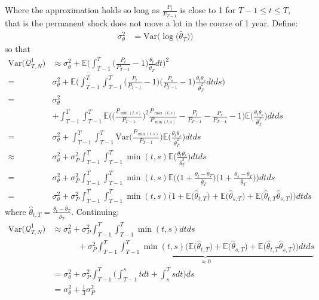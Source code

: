 Where the approximation holds so long as $\frac{P_{t}}{P_{T-1}}$ is close to 1 for $T-1 \leq t \leq T$, that is the permanent shock does not move a lot in the course of 1 year. Define:
\begin{align*}
\sigma^2_{\theta}&= \mathrm{Var}\Bigg(\log \Big(\bar{\theta}_T \Big) \Bigg)
\end{align*}
so that
\begin{align*}
\mathrm{Var}\big(\mathcal{Q}^1_{T,N}\big) &\approx \sigma^2_{\theta} + \mathbb{E} \Bigg(\int_{T-1}^{T} \Big(\frac{P_t}{P_{T-1}}-1\Big)\frac{\theta_t}{\bar{\theta}_T} dt \Bigg)^2 \\
=& \sigma^2_{\theta} + \mathbb{E} \Bigg(\int_{T-1}^{T} \int_{T-1}^{T} \Big(\frac{P_t}{P_{T-1}}-1\Big) \Big(\frac{P_s}{P_{T-1}}-1\Big) \frac{\theta_t \theta_s}{\bar{\theta}_T^2}  dt ds \Bigg) \\
=& \sigma^2_{\theta} \\
&  +  \int_{T-1}^{T} \int_{T-1}^{T} \mathbb{E}\Bigg(\Big(\frac{P_{\min(t,s)}}{P_{T-1}}\Big)^2 \frac{P_{\max(t,s)}}{P_{\min(t,s)}}-\frac{P_t}{P_{T-1}}-\frac{P_s}{P_{T-1}}-1\Bigg) \mathbb{E} \Bigg( \frac{\theta_t \theta_s}{\bar{\theta}_T^2} \Bigg)  dt ds \\
=& \sigma^2_{\theta} +    \int_{T-1}^{T} \int_{T-1}^{T} \mathrm{Var}\Bigg(\frac{P_{\min(t,s)}}{P_{T-1}} \Bigg) \mathbb{E}\Bigg( \frac{\theta_t \theta_s}{\bar{\theta}_T^2} \Bigg) dt ds \\
\approx& \sigma^2_{\theta} +  \sigma^2_P\int_{T-1}^{T} \int_{T-1}^{T}  \min(t,s)  \mathbb{E} \Bigg( \frac{\theta_t \theta_s}{\bar{\theta}_T^2} \Bigg) dt ds \\
=& \sigma^2_{\theta} +  \sigma^2_P\int_{T-1}^{T} \int_{T-1}^{T}  \min(t,s)  \mathbb{E} \Bigg(\Big( 1 +\frac{\theta_t-\bar{\theta}_T}{\bar{\theta}_T} \Big) \Big( 1 +\frac{\theta_s-\bar{\theta}_T}{\bar{\theta}_T} \Big)\Bigg) dt ds \\
=& \sigma^2_{\theta} +  \sigma^2_P\int_{T-1}^{T} \int_{T-1}^{T}  \min(t,s)   \Bigg(1+\mathbb{E}\Big( \hat{\theta}_{t,T} \Big) +\mathbb{E} \Big( \hat{\theta}_{s,T} \Big) +\mathbb{E}\Big( \hat{\theta}_{t,T} \hat{\theta}_{s,T}\Big)\Bigg) dt ds
\end{align*}
where $\hat{\theta}_{t,T} = \frac{\theta_t-\bar{\theta}_T}{\bar{\theta}_T}$. Continuing:
\begin{align*}
\mathrm{Var}\big(\mathcal{Q}^1_{T,N}\big) 
&\approx \sigma^2_{\theta} +  \sigma^2_P\int_{T-1}^{T} \int_{T-1}^{T}  \min(t,s)    dt ds \\
& \qquad \quad +\sigma^2_P \underbrace{\int_{T-1}^{T} \int_{T-1}^{T}  \min(t,s)   \Bigg(\mathbb{E}\Big( \hat{\theta}_{t,T} \Big) +\mathbb{E} \Big( \hat{\theta}_{s,T} \Big) +\mathbb{E}\Big( \hat{\theta}_{t,T} \hat{\theta}_{s,T}\Big)\Bigg) dt ds }_{\approx 0} \\
&= \sigma^2_{\theta} +  \sigma^2_P\int_{T-1}^{T} \Bigg( \int_{T-1}^{s}  t dt +  \int_{s}^{T}  s dt\Bigg) ds \\
&= \sigma^2_{\theta} +  \frac{1}{3}\sigma^2_P
\end{align*}
